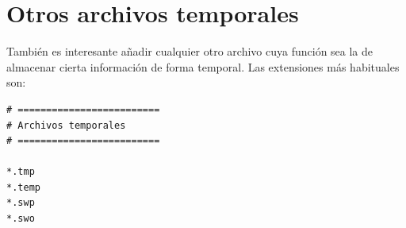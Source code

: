 \documentclass[11pt,a4paper]{article}
\theoremstyle{exercise}
\begin{document}
\section{Otros archivos temporales}

También es interesante añadir cualquier otro archivo cuya función sea la de almacenar cierta información de forma temporal. Las extensiones más habituales son:


\begin{lstlisting}[style=mdstyle]
# =========================
# Archivos temporales
# =========================

*.tmp
*.temp
*.swp
*.swo
\end{lstlisting}
\end{document}
